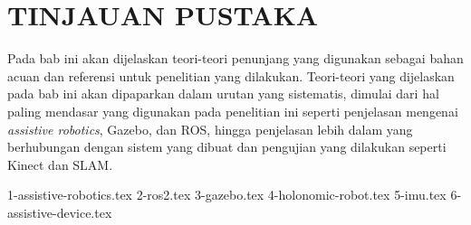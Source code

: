 \chapter{TINJAUAN PUSTAKA}
\label{chap:tinjauanpustaka}

Pada bab ini akan dijelaskan teori-teori penunjang yang digunakan sebagai bahan acuan dan referensi untuk penelitian yang dilakukan.
Teori-teori yang dijelaskan pada bab ini akan dipaparkan dalam urutan yang sistematis,
  dimulai dari hal paling mendasar yang digunakan pada penelitian ini seperti penjelasan mengenai \emph{assistive robotics}, Gazebo, dan ROS,
  hingga penjelasan lebih dalam yang berhubungan dengan sistem yang dibuat dan pengujian yang dilakukan seperti Kinect dan SLAM.

{1-assistive-robotics.tex}
{2-ros2.tex}
{3-gazebo.tex}
{4-holonomic-robot.tex}
{5-imu.tex}
{6-assistive-device.tex}
